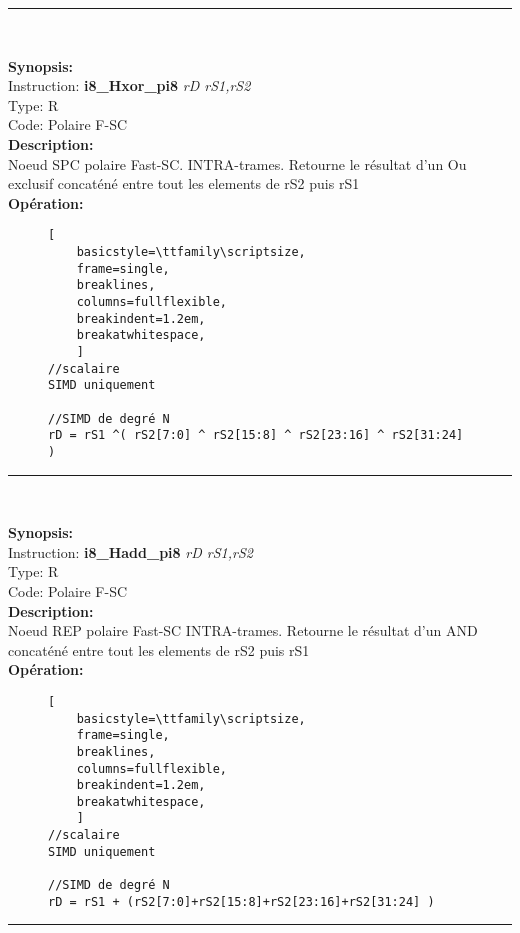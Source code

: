 \rule{8cm}{0.4pt}\\
{\scriptsize
\textbf{Synopsis:}\\
Instruction: \textbf{i8\_Hxor\_pi8 } \textit{rD rS1,rS2}\\
Type: R\\
Code: Polaire F-SC\\
\textbf{Description:}\\
Noeud SPC polaire Fast-SC. INTRA-trames. Retourne le résultat d'un Ou exclusif concaténé entre tout les elements de rS2 puis rS1\\
\textbf{Opération:}\\
    \begin{figure}[H]
    \begin{lstlisting}[
    basicstyle=\ttfamily\scriptsize,
    frame=single,
    breaklines,
    columns=fullflexible,
    breakindent=1.2em,
    breakatwhitespace,
    ]
//scalaire
SIMD uniquement 
    
//SIMD de degré N
rD = rS1 ^( rS2[7:0] ^ rS2[15:8] ^ rS2[23:16] ^ rS2[31:24] )
\end{lstlisting}
\end{figure}
}
\rule{8cm}{0.4pt}\\
{\scriptsize
\textbf{Synopsis:}\\
Instruction: \textbf{i8\_Hadd\_pi8 } \textit{rD rS1,rS2}\\
Type: R\\
Code: Polaire F-SC\\
\textbf{Description:}\\
Noeud REP polaire Fast-SC INTRA-trames. Retourne le résultat d'un AND concaténé entre tout les elements de rS2 puis rS1\\
\textbf{Opération:}\\
    \begin{figure}[H]
    \begin{lstlisting}[
    basicstyle=\ttfamily\scriptsize,
    frame=single,
    breaklines,
    columns=fullflexible,
    breakindent=1.2em,
    breakatwhitespace,
    ]
//scalaire
SIMD uniquement 
    
//SIMD de degré N
rD = rS1 + (rS2[7:0]+rS2[15:8]+rS2[23:16]+rS2[31:24] )
\end{lstlisting}
\end{figure}
}
\rule{8cm}{0.4pt}\\
